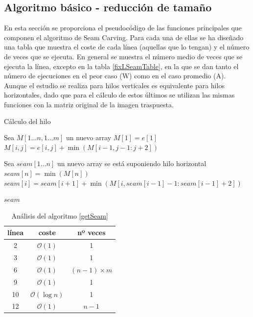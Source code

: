 \documentclass[12pt,a4paper,oneside]{article}
\let\oldReturn\Return
\renewcommand{\Return}{\State\oldReturn}
\begin{document}
\subsection{Algoritmo básico - reducción de tamaño}
En esta sección se proporciona el pseudocódigo de las funciones principales que componen
el algoritmo de Seam Carving. Para cada una de ellas se ha diseñado una tabla que muestra
el coste de cada línea (aquellas que lo tengan) y el número de veces que se ejecuta. En
general se muestra el número medio de veces que se ejecuta la línea, excepto en la tabla
\ref{fixLSeamTable}, en la que se dan tanto el número de ejecuciones en el peor caso (W)
como en el caso promedio (A). Aunque el estudio se realiza para hilos verticales es
equivalente para hilos horizontales, dado que para el cálculo de estos últimos se utilizan
las mismas funciones con la matriz original de la imagen traspuesta.

\begin{algorithm}
    \caption{Cálculo del hilo}\label{getSeam}
    \begin{algorithmic}[1]
        \State Sea $M[1 \ldots {n}, 1 \ldots m] $ un nuevo array
        \State $M[1] = e[1]$   
                \State $M[i, j] = e[i, j] + \min (M[i-1, j-1:j+2])$
            \EndFor
        \EndFor


        \State Sea $seam[1 \ldots n]$ un nuevo array \Comment se está suponiendo hilo horizontal
        \State $seam[n] = \min (M[n])$
            \State $seam[i] = seam[i+1] + \min (M[i, seam[i-1]-1:seam[i-1]+2])$
        \EndFor

        \Return $seam$
        \EndFunction
    \end{algorithmic}
\end{algorithm}

\begin{table}
    \center
    \begin{tabular}{|c|c|c|}
        \hline
        línea & coste & nº veces \\
        \hline
        2 & $\mathcal{O}(1)$ & 1 \\
        \hline
        3 & $\mathcal{O}(1)$ & 1 \\
        \hline
        6 & $\mathcal{O}(1)$ & $(n-1) \times m$ \\
        \hline
        9 & $\mathcal{O}(1)$ & 1 \\
        \hline
        10 & $\mathcal{O}(\log{}n)$ & 1 \\
        \hline
        12 & $\mathcal{O}(1)$ & $n-1$ \\
        \hline
    \end{tabular}
    \caption{Análisis del algoritmo \ref{getSeam}}\label{getSeamTable}
\end{table}
\end{document}
